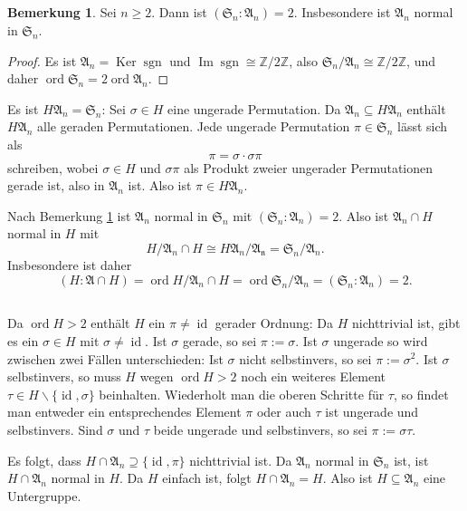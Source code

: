 \documentclass[a4paper,10pt]{article}
\theoremstyle{definition}
\newtheorem{bem}[beh]{Bemerkung}
\newcommand{\Z}{\mathbb{Z}}
\newcommand{\Sn}{\mathfrak{S}}
\newcommand{\mf}[1]{\mathfrak{#1}}
\newcommand{\id}{\operatorname{id}}
\newcommand{\ord}{\operatorname{ord}}
\newcommand{\sgn}{\operatorname{sgn}}
\newcommand{\Img}{\operatorname{Im}}
\newcommand{\Ker}{\operatorname{Ker}}
\begin{document}
\subsection{}

\begin{bem}\label{bem: index A_n}
 Sei $n \geq 2$. Dann ist $(\Sn_n : \mf{A}_n) = 2$. Insbesondere ist $\mf{A}_n$ normal in $\Sn_n$.
\end{bem}
\begin{proof}
 Es ist $\mf{A}_n = \Ker \sgn$ und $\Img \sgn \cong \Z/2\Z$, also $\Sn_n / \mf{A}_n \cong \Z/2\Z$, und daher \mbox{$\ord \Sn_n = 2 \ord \mf{A}_n$}.
\end{proof}

Es ist $H \mf{A}_n = \Sn_n$: Sei $\sigma \in H$ eine ungerade Permutation. Da $\mf{A}_n \subseteq H \mf{A}_n$ enthält $H\mf{A}_n$ alle geraden Permutationen. Jede ungerade Permutation $\pi \in \Sn_n$ lässt sich als
\[
 \pi = \sigma \cdot \sigma \pi
\]
schreiben, wobei $\sigma \in H$ und $\sigma \pi$ als Produkt zweier ungerader Permutationen gerade ist, also in $\mf{A}_n$ ist. Also ist $\pi \in H \mf{A}_n$.

Nach Bemerkung \ref{bem: index A_n} ist $\mf{A}_n$ normal in $\Sn_n$ mit $(\Sn_n : \mf{A}_n) = 2$. Also ist $\mf{A}_n \cap H$ normal in $H$ mit
\[
 H / \mf{A}_n \cap H \cong H\mf{A}_n / \mf{A_n} = \Sn_n / \mf{A}_n.
\]
Insbesondere ist daher
\[
 (H : \mf{A} \cap H) = \ord H / \mf{A}_n \cap H = \ord \Sn_n / \mf{A}_n = (\Sn_n : \mf{A}_n) = 2.
\]


\subsection{}
Da $\ord H > 2$ enthält $H$ ein $\pi \neq \id$ gerader Ordnung: Da $H$ nichttrivial ist, gibt es ein $\sigma \in H$ mit $\sigma \neq \id$. Ist $\sigma$ gerade, so sei $\pi := \sigma$. Ist $\sigma$ ungerade so wird zwischen zwei Fällen unterschieden: Ist $\sigma$ nicht selbstinvers, so sei $\pi := \sigma^2$. Ist $\sigma$ selbstinvers, so muss $H$ wegen $\ord H > 2$ noch ein weiteres Element $\tau \in H \smallsetminus \{\id,\sigma\}$ beinhalten. Wiederholt man die oberen Schritte für $\tau$, so findet man entweder ein entsprechendes Element $\pi$ oder auch $\tau$ ist ungerade und selbstinvers. Sind $\sigma$ und $\tau$ beide ungerade und selbstinvers, so sei $\pi := \sigma \tau$.

Es folgt, dass $H \cap \mf{A}_n \supseteq \{\id, \pi\}$ nichttrivial ist. Da $\mf{A}_n$ normal in $\Sn_n$ ist, ist $H \cap \mf{A}_n$ normal in $H$. Da $H$ einfach ist, folgt $H \cap \mf{A}_n = H$. Also ist $H \subseteq \mf{A}_n$ eine Untergruppe.
\end{document}
